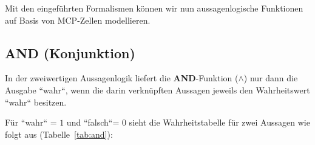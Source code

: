 Mit den eingeführten Formalismen können wir nun aussagenlogische Funktionen auf Basis von MCP-Zellen modellieren.


\subsection*{AND (Konjunktion)}
In der zweiwertigen Aussagenlogik liefert die \textbf{AND}-Funktion ($\land$) nur dann die Ausgabe ``wahr``, wenn die darin verknüpften Aussagen jeweils den Wahrheitswert ``wahr`` besitzen.

Für ``wahr`` = $1$ und ``falsch``= $0$ sieht die Wahrheitstabelle für zwei Aussagen wie folgt aus (Tabelle~\ref{tab:and}):

